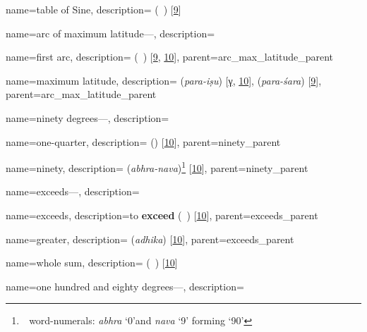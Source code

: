 {
        name={table of Sine},
        description={ (\jadval\idafaconsonant\ \jayb) [\hyperlink{PEpass9}{9}]}
}

{
        name={arc of maximum latitude---},
        description={\phantom{x}\nopagebreak}
}

{
        name={first arc},
        description={ (\qaws\idafaconsonant\ \avval) [\hyperlink{PEpass9}{9}, \hyperlink{PEpass10}{10}]},
        parent={arc_max_latitude_parent}
}        

{
        name={maximum latitude},
        description={ (\textit{para-iṣu}) [\hyperlink{SEpassC}{γ}, \hyperlink{SEpass10}{10}],  (\textit{para-śara}) [\hyperlink{SEpass9}{9}]},
        parent={arc_max_latitude_parent}
}        

{
        name={ninety degrees---},
        description={\phantom{x}\nopagebreak}
}
  
{
        name={one-quarter},
        description={ (\rub) [\hyperlink{PEpass10}{10}]},
        parent={ninety_parent}
}

{
        name={ninety},
        description={ (\textit{abhra-nava})\footnote{\,\bhutasamkhya\ word-numerals: \textit{abhra} `0'and  \textit{nava} `9' forming `90'} [\hyperlink{SEpass10}{10}]},
        parent={ninety_parent}
}

{
        name={exceeds---},
        description={\phantom{x}\nopagebreak}
}

{
        name={exceeds},
        description={to \textbf{exceed}\quad {} (\ziyadi\ \shudan) [\hyperlink{PEpass10}{10}]},
        parent={exceeds_parent}            
}           

{
        name={greater},
        description={ (\textit{adhika}) [\hyperlink{SEpass10}{10}]},
        parent={exceeds_parent}
}
 

{
        name={whole sum},
        description={ (\tamam\idafaconsonant\ \majmu) [\hyperlink{PEpass10}{10}]}
}

{
        name={one hundred and eighty degrees---},
        description={\phantom{x}\nopagebreak}
}

